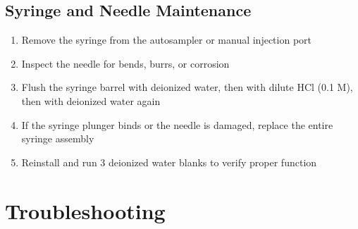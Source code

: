 \documentclass[
  11pt,
  letterpaper,
]{article}
\providecommand{\tightlist}{%
  \setlength{\itemsep}{0pt}\setlength{\parskip}{0pt}}
\begin{document}
\subsection{Syringe and Needle
Maintenance}\label{syringe-and-needle-maintenance}

\begin{enumerate}
\def\labelenumi{\arabic{enumi}.}
\tightlist
\item
  Remove the syringe from the autosampler or manual injection port
\item
  Inspect the needle for bends, burrs, or corrosion
\item
  Flush the syringe barrel with deionized water, then with dilute HCl
  (0.1 M), then with deionized water again
\item
  If the syringe plunger binds or the needle is damaged, replace the
  entire syringe assembly
\item
  Reinstall and run 3 deionized water blanks to verify proper function
\end{enumerate}

\section{Troubleshooting}\label{troubleshooting}
\end{document}
